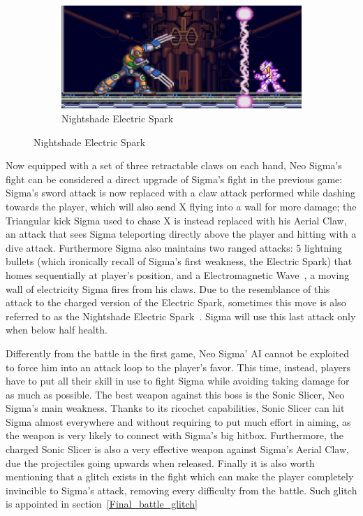 \begin{figure}[htp]
	\ContinuedFloat
	\centering
	\begin{subfigure}{0.6\linewidth}
		\centering
		\includegraphics[width=\linewidth]{figures/X2/Hunter_stages/Sigma_electric_wall.png}
		\caption{Nightshade Electric Spark}
	\end{subfigure}
\end{figure}
Now equipped with a set of three retractable claws on each hand, Neo Sigma's fight can be considered a direct upgrade of Sigma's fight in the previous game: Sigma's sword attack is now replaced with a claw attack performed while dashing towards the player, which will also send X flying into a wall for more damage; the Triangular kick Sigma used to chase X is instead replaced with his Aerial Claw, an attack that sees Sigma teleporting directly above the player and hitting with a dive attack. Furthermore Sigma also maintains two ranged attacks: 5 lightning bullets (which ironically recall of Sigma's first weakness, the Electric Spark) that homes sequentially at player's position, and a Electromagnetic Wave~\cite{book:Compendium}, a moving wall of electricity Sigma fires from his claws. Due to the resemblance of this attack to the charged version of the Electric Spark, sometimes this move is also referred to as the Nightshade Electric Spark~\cite{book:MH_field_guide}. Sigma will use this last attack only when below half health.

Differently from the battle in the first game, Neo Sigma' AI cannot be exploited to force him into an attack loop to the player's favor. This time, instead, players have to put all their skill in use to fight Sigma while avoiding taking damage for as much as possible. The best weapon against this boss is the Sonic Slicer, Neo Sigma's main weakness. Thanks to its ricochet capabilities, Sonic Slicer can hit Sigma almost everywhere and without requiring to put much effort in aiming, as the weapon is very likely to connect with Sigma's big hitbox. Furthermore, the charged Sonic Slicer is also a very effective weapon against Sigma's Aerial Claw, due the projectiles going  upwards when released. Finally it is also worth mentioning that a glitch exists in the fight which can make the player completely invincible to Sigma's attack, removing every difficulty from the battle. Such glitch is appointed in section~\ref{Final_battle_glitch}

